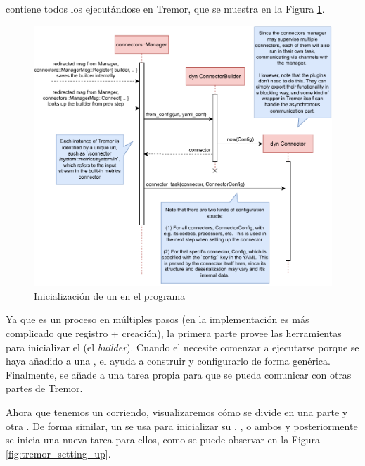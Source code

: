  contiene todos los \connectors ejecutándose en
Tremor, que se muestra en la Figura \ref{fig:tremor_initializing}.

\begin{figure}
    \centering
    \includegraphics[width=\textwidth]{./Imagenes/initializing.pdf}
    \caption{Inicialización de un \connector en el programa}%
    \label{fig:tremor_initializing}
\end{figure}

Ya que es un proceso en múltiples pasos (en la implementación es más complicado
que registro + creación), la primera parte provee las herramientas para
inicializar el \connector (el \emph{builder}). Cuando el \connector necesite
comenzar a ejecutarse porque se haya añadido a una \pipeline, el \builder ayuda
a construir y configurarlo de forma genérica. Finalmente, se añade a una tarea
propia para que se pueda comunicar con otras partes de Tremor.

Ahora que tenemos un \connector corriendo, visualizaremos cómo se divide en una
parte \sink y otra \source. De forma similar, un \builder se usa para
inicializar su \sink, \source, o ambos y posteriormente se inicia una nueva
tarea para ellos, como se puede observar en la Figura
\ref{fig:tremor_setting_up}.

